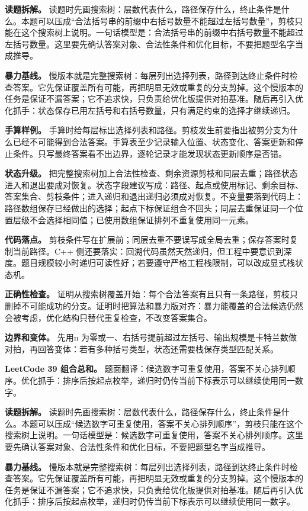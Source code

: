 \textbf{读题拆解。} 读题时先画搜索树：层数代表什么，路径保存什么，终止条件是什么。本题可以压成“合法括号串的前缀中右括号数量不能超过左括号数量”，剪枝只能在这个搜索树上说明。一句话模型是：合法括号串的前缀中右括号数量不能超过左括号数量。这里要先确认答案对象、合法性条件和优化目标，不要把题型名字当成推导。

\textbf{暴力基线。} 慢版本就是完整搜索树：每层列出选择列表，路径到达终止条件时检查答案。它先保证覆盖所有可能，再把明显无效或重复的分支剪掉。这个慢版本的任务是保证不漏答案；它不追求快，只负责给优化版提供对拍基准。随后再引入优化抓手：状态保存已用左括号和右括号数量，只有满足约束的选择才继续递归。

\textbf{手算样例。} 手算时给每层标出选择列表和路径。剪枝发生前要指出被剪分支为什么已经不可能得到合法答案。手算表至少记录输入位置、状态变化、答案更新和停止条件。只写最终答案看不出边界，逐轮记录才能发现状态更新顺序是否错。

\textbf{状态升级。} 把完整搜索树加上合法性检查、剩余资源剪枝和同层去重；路径状态进入和退出要成对恢复。状态字段建议写成：路径、起点或使用标记、剩余目标、答案集合、剪枝条件；进入递归和退出递归必须成对恢复。不变量要落到代码上：路径数组保存已经做出的选择；起点下标保证组合不回头；同层去重保证同一个位置层级不会选择相同值；已使用数组保证排列不重复使用同一元素。

\textbf{代码落点。} 剪枝条件写在扩展前；同层去重不要误写成全局去重；保存答案时复制当前路径。C++ 侧还要落实：回溯代码虽然天然递归，但工程中要意识到深度。题目规模较小时递归可读性好；若要遵守严格工程栈限制，可以改成显式栈状态机。

\textbf{正确性检查。} 证明从搜索树覆盖开始：每个合法答案有且只有一条路径，剪枝只删掉不可能成功的分支。证明时把算法和暴力版对齐：暴力能覆盖的合法候选仍然会被考虑，优化结构只替代重复检查，不改变答案集合。

\textbf{边界和变体。} 先用n 为零或一、右括号提前超过左括号、输出规模是卡特兰数做对拍，再回答变体：若有多种括号类型，状态还需要栈保存类型匹配关系。

\noindent\textbf{LeetCode 39 组合总和。} 题面翻译：候选数字可重复使用，答案不关心排列顺序。优化抓手：排序后按起点枚举，递归时仍传当前下标表示可以继续使用同一数字。

\textbf{读题拆解。} 读题时先画搜索树：层数代表什么，路径保存什么，终止条件是什么。本题可以压成“候选数字可重复使用，答案不关心排列顺序”，剪枝只能在这个搜索树上说明。一句话模型是：候选数字可重复使用，答案不关心排列顺序。这里要先确认答案对象、合法性条件和优化目标，不要把题型名字当成推导。

\textbf{暴力基线。} 慢版本就是完整搜索树：每层列出选择列表，路径到达终止条件时检查答案。它先保证覆盖所有可能，再把明显无效或重复的分支剪掉。这个慢版本的任务是保证不漏答案；它不追求快，只负责给优化版提供对拍基准。随后再引入优化抓手：排序后按起点枚举，递归时仍传当前下标表示可以继续使用同一数字。

